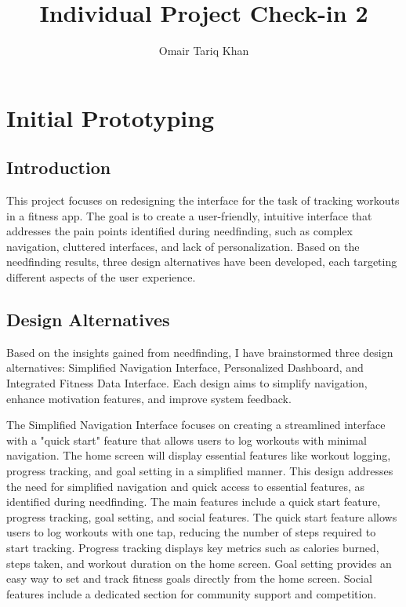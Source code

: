 \documentclass[
	letterpaper, %
]{jdf}
\author{Omair Tariq Khan}
\title{Individual Project Check-in 2}
\begin{document}

\maketitle
\hfill \break

\section{Initial Prototyping}
\subsection{Introduction}
This project focuses on redesigning the interface for the task of tracking workouts in a fitness app. The goal is to create a user-friendly, intuitive interface that addresses the pain points identified during needfinding, such as complex navigation, cluttered interfaces, and lack of personalization. Based on the needfinding results, three design alternatives have been developed, each targeting different aspects of the user experience.

\subsection{Design Alternatives}
Based on the insights gained from needfinding, I have brainstormed three design alternatives: Simplified Navigation Interface, Personalized Dashboard, and Integrated Fitness Data Interface. Each design aims to simplify navigation, enhance motivation features, and improve system feedback.

The Simplified Navigation Interface focuses on creating a streamlined interface with a "quick start" feature that allows users to log workouts with minimal navigation. The home screen will display essential features like workout logging, progress tracking, and goal setting in a simplified manner. This design addresses the need for simplified navigation and quick access to essential features, as identified during needfinding. The main features include a quick start feature, progress tracking, goal setting, and social features. The quick start feature allows users to log workouts with one tap, reducing the number of steps required to start tracking. Progress tracking displays key metrics such as calories burned, steps taken, and workout duration on the home screen. Goal setting provides an easy way to set and track fitness goals directly from the home screen. Social features include a dedicated section for community support and competition.
\end{document}
